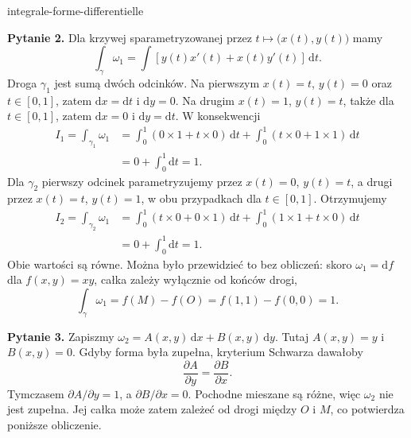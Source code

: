 \begin{exo}{integrale-forme-differentielle}
\begin{solution}
\textbf{Pytanie 2.} Dla krzywej sparametryzowanej przez $t\mapsto\bigl(x(t),y(t)\bigr)$ mamy
\[\int_\gamma\omega_1=\int\left[y(t)x'(t)+x(t)y'(t)\right]\,\mathrm{d}t.\]
Droga $\gamma_1$ jest sumą dwóch odcinków. Na pierwszym $x(t)=t$, $y(t)=0$
oraz $t\in[0,1]$, zatem $\mathrm{d}x=\mathrm{d}t$ i $\mathrm{d}y=0$. Na
drugim $x(t)=1$, $y(t)=t$, także dla $t\in[0,1]$, zatem $\mathrm{d}x=0$ i
$\mathrm{d}y=\mathrm{d}t$. W konsekwencji
\[\begin{aligned}I_1=\int_{\gamma_1}\omega_1&=\int_0^1(0\times1+t\times0)\,\mathrm{d}t+\int_0^1(t\times0+1\times1)\,\mathrm{d}t\\&=0+\int_0^1\mathrm{d}t=1.\end{aligned}\]
Dla $\gamma_2$ pierwszy odcinek parametryzujemy przez $x(t)=0$, $y(t)=t$,
a drugi przez $x(t)=t$, $y(t)=1$, w obu przypadkach dla $t\in[0,1]$. Otrzymujemy
\[\begin{aligned}I_2=\int_{\gamma_2}\omega_1&=\int_0^1(t\times0+0\times1)\,\mathrm{d}t+\int_0^1(1\times1+t\times0)\,\mathrm{d}t\\&=0+\int_0^1\mathrm{d}t=1.\end{aligned}\]
Obie wartości są równe. Można było przewidzieć to bez obliczeń: skoro
$\omega_1=\mathrm{d}f$ dla $f(x,y)=xy$, całka zależy wyłącznie od końców drogi,
\[\int_\gamma\omega_1=f(M)-f(O)=f(1,1)-f(0,0)=1.\]

\textbf{Pytanie 3.} Zapiszmy $\omega_2=A(x,y)\,\mathrm{d}x+B(x,y)\,\mathrm{d}y$.
Tutaj $A(x,y)=y$ i $B(x,y)=0$. Gdyby forma była zupełna, kryterium Schwarza dawałoby
\[\frac{\partial A}{\partial y}=\frac{\partial B}{\partial x}.\]
Tymczasem $\partial A/\partial y=1$, a $\partial B/\partial x=0$. Pochodne
mieszane są różne, więc $\omega_2$ nie jest zupełna. Jej całka może zatem
zależeć od drogi między $O$ i $M$, co potwierdza poniższe obliczenie.


\end{solution}
\end{exo}
